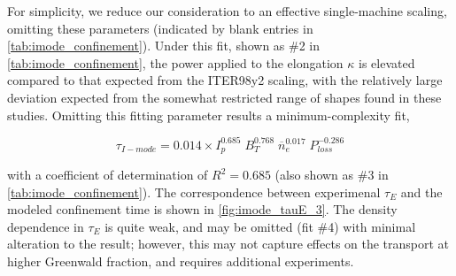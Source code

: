 For simplicity, we reduce our consideration to an effective single-machine scaling, omitting these parameters (indicated by blank entries in \cref{tab:imode_confinement}).  Under this fit, shown as \#2 in \cref{tab:imode_confinement}, the power applied to the elongation $\kappa$ is elevated compared to that expected from the ITER98y2 scaling, with the relatively large deviation expected from the somewhat restricted range of shapes found in these studies.  Omitting this fitting parameter results a minimum-complexity fit,

\begin{equation}\label{eq:tauE_fit_3}
 \tau_{I-mode} = 0.014 \times I_p^{0.685} \; B_T^{0.768} \; \overline{n}_e^{0.017} \; P_{loss}^{-0.286}
\end{equation}

\noindent with a coefficient of determination of $R^2 = 0.685$ (also shown as \#3 in \cref{tab:imode_confinement}).  The correspondence between experimenal $\tau_E$ and the modeled confinement time is shown in \cref{fig:imode_tauE_3}.  The density dependence in $\tau_E$ is quite weak, and may be omitted (fit \#4) with minimal alteration to the result; however, this may not capture effects on the transport at higher Greenwald fraction, and requires additional experiments.

